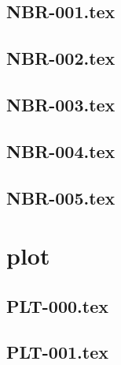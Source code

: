 \renewcommand{\xxexo}{NBR-001.tex} 
\subsection*{\xxexo} 
\graphicspath{{../../exosnombres/equadiffs/\xxexo/}}
 
 
\renewcommand{\xxexo}{NBR-002.tex} 
\subsection*{\xxexo} 
\graphicspath{{../../exosnombres/equadiffs/\xxexo/}}
 
 
\renewcommand{\xxexo}{NBR-003.tex} 
\subsection*{\xxexo} 
\graphicspath{{../../exosnombres/equadiffs/\xxexo/}}
 
 
\renewcommand{\xxexo}{NBR-004.tex} 
\subsection*{\xxexo} 
\graphicspath{{../../exosnombres/equadiffs/\xxexo/}}
 
 
\renewcommand{\xxexo}{NBR-005.tex} 
\subsection*{\xxexo} 
\graphicspath{{../../exosnombres/equadiffs/\xxexo/}}
 
 
\section*{plot}
\renewcommand{\xxexo}{PLT-000.tex} 
\subsection*{\xxexo} 
\graphicspath{{../../exosplot/equadiffs/\xxexo/}}
 
 
\renewcommand{\xxexo}{PLT-001.tex} 
\subsection*{\xxexo} 
\graphicspath{{../../exosplot/equadiffs/\xxexo/}}
 
 

